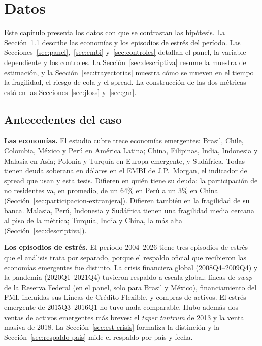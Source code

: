 \chapter{Datos}
\label{sec:datos}

Este capítulo presenta los datos con que se contrastan las hipótesis. La Sección~\ref{sec:antecedentes} describe las economías y los episodios de estrés del período. Las Secciones~\ref{sec:panel},~\ref{sec:embi} y~\ref{sec:controles} detallan el panel, la variable dependiente y los controles. La Sección~\ref{sec:descriptiva} resume la muestra de estimación, y la Sección~\ref{sec:trayectorias} muestra cómo se mueven en el tiempo la fragilidad, el riesgo de cola y el spread. La construcción de las dos métricas está en las Secciones~\ref{sec:jloss} y~\ref{sec:gar}.

\section{Antecedentes del caso}
\label{sec:antecedentes}

\textbf{Las economías.} El estudio cubre trece economías emergentes: Brasil, Chile, Colombia, México y Perú en América Latina; China, Filipinas, India, Indonesia y Malasia en Asia; Polonia y Turquía en Europa emergente, y Sudáfrica. Todas tienen deuda soberana en dólares en el EMBI de J.P.\ Morgan, el indicador de spread que usan \citet{Chari2024b} y esta tesis. Difieren en quién tiene su deuda: la participación de no residentes va, en promedio, de un 64\% en Perú a un 3\% en China (Sección~\ref{sec:participacion-extranjera}). Difieren también en la fragilidad de su banca. Malasia, Perú, Indonesia y Sudáfrica tienen una fragilidad media cercana al piso de la métrica; Turquía, India y China, la más alta (Sección~\ref{sec:descriptiva}).

\textbf{Los episodios de estrés.} El período 2004--2026 tiene tres episodios de estrés que el análisis trata por separado, porque el respaldo oficial que recibieron las economías emergentes fue distinto. La crisis financiera global (2008Q4--2009Q4) y la pandemia (2020Q1--2021Q4) tuvieron respaldo a escala global: líneas de \textit{swap} de la Reserva Federal (en el panel, solo para Brasil y México), financiamiento del FMI, incluidas sus Líneas de Crédito Flexible, y compras de activos. El estrés emergente de 2015Q3--2016Q1 no tuvo nada comparable. Hubo además dos ventas de activos emergentes más breves: el \textit{taper tantrum} de 2013 y la venta masiva de 2018. La Sección~\ref{sec:est-crisis} formaliza la distinción y la Sección~\ref{sec:respaldo-pais} mide el respaldo por país y fecha.

